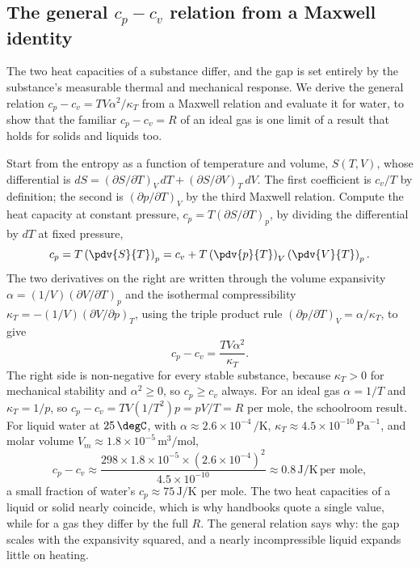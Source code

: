 \subsection{The general $c_p - c_v$ relation from a Maxwell identity}

The two heat capacities of a substance differ, and the gap is set entirely by the
substance's measurable thermal and mechanical response. We derive the general
relation $c_p - c_v = T V \alpha^2/\kappa_T$ from a Maxwell relation and evaluate
it for water, to show that the familiar $c_p - c_v = R$ of an ideal gas is one
limit of a result that holds for solids and liquids too.

Start from the entropy as a function of temperature and volume, $S(T,V)$, whose
differential is $dS = (\partial S/\partial T)_V\,dT + (\partial S/\partial
V)_T\,dV$. The first coefficient is $c_v/T$ by definition; the second is
$(\partial p/\partial T)_V$ by the third Maxwell relation. Compute the heat
capacity at constant pressure, $c_p = T(\partial S/\partial T)_p$, by dividing the
differential by $dT$ at fixed pressure,
\[
c_p = T\left(\pdv{S}{T}\right)_p
= c_v + T\left(\pdv{p}{T}\right)_V\left(\pdv{V}{T}\right)_p.
\]
The two derivatives on the right are written through the volume
expansivity $\alpha = (1/V)(\partial V/\partial T)_p$ and the isothermal
compressibility $\kappa_T = -(1/V)(\partial V/\partial p)_T$, using the triple
product rule $(\partial p/\partial T)_V = \alpha/\kappa_T$, to give
\[
c_p - c_v = \frac{T V \alpha^2}{\kappa_T}.
\]
The right side is non-negative for every stable substance, because $\kappa_T > 0$
for mechanical stability and $\alpha^2 \ge 0$, so $c_p \ge c_v$ always. For an
ideal gas $\alpha = 1/T$ and $\kappa_T = 1/p$, so $c_p - c_v = TV(1/T^2)p = pV/T =
R$ per mole, the schoolroom result. For liquid water at $25\,\degC$, with $\alpha
\approx 2.6\times10^{-4}\,/\si{\kelvin}$, $\kappa_T \approx
4.5\times10^{-10}\,\text{Pa}^{-1}$, and molar volume $V_m \approx
1.8\times10^{-5}\,\text{m}^3/\text{mol}$,
\[
c_p - c_v \approx \frac{298 \times 1.8\times10^{-5} \times (2.6\times10^{-4})^2}
{4.5\times10^{-10}}
\approx 0.8\,\si{\joule\per\kelvin}\,\text{per mole},
\]
a small fraction of water's $c_p \approx 75\,\si{\joule\per\kelvin}$ per mole. The
two heat capacities of a liquid or solid nearly coincide, which is why handbooks
quote a single value, while for a gas they differ by the full $R$. The general
relation says why: the gap scales with the expansivity squared, and a
nearly incompressible liquid expands little on heating.


